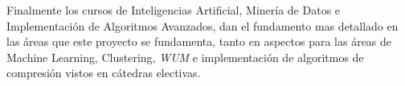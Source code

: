 \documentclass{udparticle}
\begin{document}
Finalmente los cursos de Inteligencias Artificial, Minería de Datos e Implementación de Algoritmos Avanzados, dan el fundamento mas detallado
en las áreas que este proyecto se fundamenta, tanto en aspectos para las áreas de Machine Learning, Clustering, \emph{WUM} e implementación de algoritmos de compresión
vistos en cátedras electivas.



  
% 


 
\end{document}
